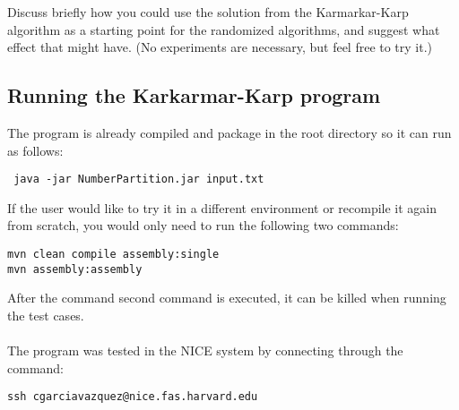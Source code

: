 \documentclass[tikz, 12pt]{scrartcl}
\begin{document}
Discuss briefly how you could use the solution from the Karmarkar-Karp algorithm as a starting point for the randomized algorithms, and suggest what effect that might have. (No experiments are necessary, but feel free to try it.)

\subsection{Running the Karkarmar-Karp program}
The program is already compiled and package in the root directory so it can run as follows:

\begin{verbatim}
 java -jar NumberPartition.jar input.txt 
\end{verbatim}

If the user would like to try it in a different environment or recompile it again from scratch, you would only need to run the following two commands:

\begin{verbatim}
mvn clean compile assembly:single
mvn assembly:assembly
\end{verbatim}

After the command second command is executed, it can be killed when running the test cases.\\
\\
The program was tested in the NICE system by connecting through the command:
\begin{verbatim}
ssh cgarciavazquez@nice.fas.harvard.edu
\end{verbatim}
\end{document}

